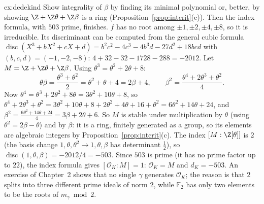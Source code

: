 \begin{solution}{ex:dedekind}
\idea Show integrality of $\beta$ by finding its minimal polynomial or, better, by showing $\Z+\Z\theta+\Z\beta$ is a ring
(Proposition~\ref{prop:intcrit}(c)). Then the index formula, with $503$ prime, finishes.
\writeup $f$ has no root among $\pm1,\pm2,\pm4,\pm8$, so it is irreducible. Its discriminant can be computed from the
general cubic formula $\operatorname{disc}(X^3+bX^2+cX+d)=b^2c^2-4c^3-4b^3d-27d^2+18bcd$ with $(b,c,d)=(-1,-2,-8)$:
$4+32-32-1728-288=-2012$. Let $M=\Z+\Z\theta+\Z\beta$. Using $\theta^3=\theta^2+2\theta+8$:
\[
\theta\beta=\frac{\theta^3+\theta^2}2=\theta^2+\theta+4=2\beta+4,\qquad
\beta^2=\frac{\theta^4+2\theta^3+\theta^2}4.
\]
Now $\theta^4=\theta^3+2\theta^2+8\theta=3\theta^2+10\theta+8$, so $\theta^4+2\theta^3+\theta^2=3\theta^2+10\theta+8+
2\theta^2+4\theta+16+\theta^2=6\theta^2+14\theta+24$, and $\beta^2=\frac{6\theta^2+14\theta+24}4=3\beta+2\theta+6$.
So $M$ is stable under multiplication by $\theta$ (using $\theta^2=2\beta-\theta$) and by $\beta$: it is a ring,
finitely generated as a group, so its elements are algebraic integers by Proposition~\ref{prop:intcrit}(c). The index
$[M:\Z[\theta]]$ is $2$ (the basis change $1,\theta,\theta^2\to1,\theta,\beta$ has determinant $\frac12$), so
$\operatorname{disc}(1,\theta,\beta)=-2012/4=-503$. Since $503$ is prime (it has no prime factor up to $22$), the index
formula gives $[\mathcal O_K:M]=1$: $\mathcal O_K=M$ and $d_K=-503$. An exercise of Chapter~2 shows that no single
$\gamma$ generates $\mathcal O_K$; the reason is that $2$ splits into three different prime ideals of norm $2$,
while $\mathbb F_2$ has only two elements to be the roots of $m_\gamma\bmod2$.
\end{solution}

